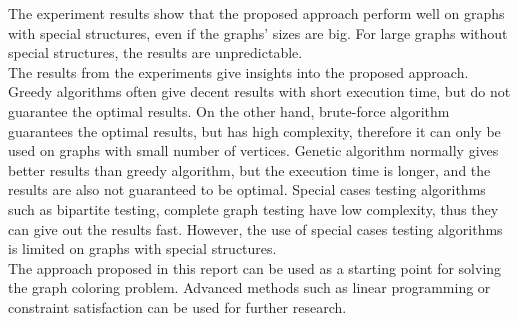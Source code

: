 \documentclass[a4paper]{report}
\begin{document}
	The experiment results show that the proposed approach perform well on graphs with special structures, even if the graphs' sizes are big. For large graphs without special structures, the results are unpredictable. \\
	
	The results from the experiments give insights into the proposed approach. Greedy algorithms often give decent results with short execution time, but do not guarantee the optimal results. On the other hand, brute-force algorithm guarantees the optimal results, but has high complexity, therefore it can only be used on graphs with small number of vertices. Genetic algorithm normally gives better results than greedy algorithm, but the execution time is longer, and the results are also not guaranteed to be optimal. Special cases testing algorithms such as bipartite testing, complete graph testing have low complexity, thus they can give out the results fast. However, the use of special cases testing algorithms is limited on graphs with special structures. \\
	
	The approach proposed in this report can be used as a starting point for solving the graph coloring problem. Advanced methods such as linear programming or constraint satisfaction can be used for further research.
	
	
	
	
\end{document}
